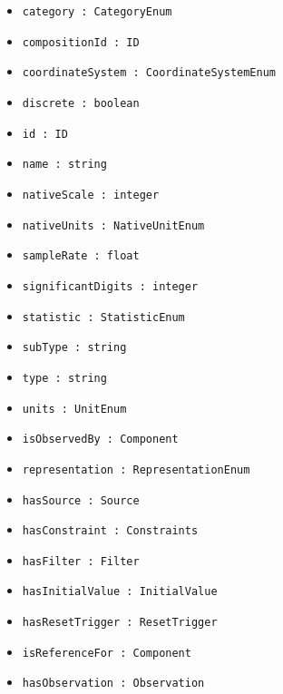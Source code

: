\begin{itemize}
\item \texttt{category : CategoryEnum}

\item \texttt{compositionId : ID}

\item \texttt{coordinateSystem : CoordinateSystemEnum}

\item \texttt{discrete : boolean}

\item \texttt{id : ID}

\item \texttt{name : string}

\item \texttt{nativeScale : integer}

\item \texttt{nativeUnits : NativeUnitEnum}

\item \texttt{sampleRate : float}

\item \texttt{significantDigits : integer}

\item \texttt{statistic : StatisticEnum}

\item \texttt{subType : string}

\item \texttt{type : string}

\item \texttt{units : UnitEnum}

\item \texttt{isObservedBy : Component}

\item \texttt{representation : RepresentationEnum}

\item \texttt{hasSource : Source}

\item \texttt{hasConstraint : Constraints}

\item \texttt{hasFilter : Filter}

\item \texttt{hasInitialValue : InitialValue}

\item \texttt{hasResetTrigger : ResetTrigger}

\item \texttt{isReferenceFor : Component}

\item \texttt{hasObservation : Observation}

\end{itemize}
\FloatBarrier
